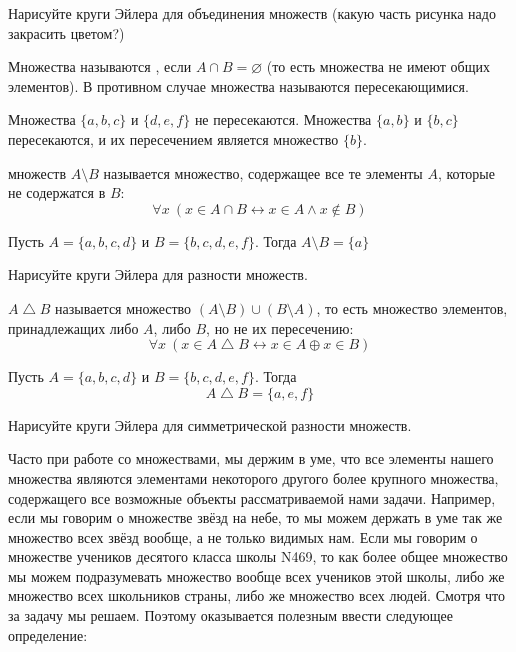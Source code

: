 \begin{exercise}
Нарисуйте круги Эйлера для объединения множеств (какую часть рисунка надо закрасить цветом?)
\end{exercise}

\begin{definition}
Множества называются , если $A\cap B = \varnothing$ (то есть множества не имеют общих элементов). В противном случае множества называются пересекающимися.
\end{definition}

\begin{example}
Множества $\{a, b, c\}$ и $\{d, e, f\}$ не пересекаются. Множества $\{a, b\}$ и $\{b, c\}$ пересекаются, и их пересечением является множество $\{b\}$.
\end{example}

\begin{definition}
 множеств $A\setminus B$ называется множество, содержащее все те элементы $A$, которые не содержатся в $B$:
$$\forall x\ (x \in A\cap B \leftrightarrow x\in A \wedge x \not \in B)$$
\end{definition}

\begin{example}
Пусть $A = \{a, b, c, d\}$ и $B = \{b, c, d, e, f\}$. Тогда $A\setminus B = \{a\}$
\end{example}

\begin{exercise}
Нарисуйте круги Эйлера для разности множеств.
\end{exercise}

\begin{definition}
 $A\bigtriangleup B$ называется множество $(A\setminus B)\cup (B\setminus A)$, то есть множество элементов, принадлежащих либо $A$, либо $B$, но не их пересечению:
$$\forall x\ (x\in A\bigtriangleup B \leftrightarrow x\in A \oplus x\in B)$$
\end{definition}

\begin{example}Пусть $A = \{a, b, c, d\}$ и $B = \{b, c, d, e, f\}$. Тогда
$$A\bigtriangleup B = \{a, e, f\}$$
\end{example}

\begin{exercise}
Нарисуйте круги Эйлера для симметрической разности множеств.
\end{exercise}

Часто при работе со множествами, мы держим в уме, что все элементы нашего множества являются элементами некоторого другого более крупного множества, содержащего все возможные объекты рассматриваемой нами задачи. Например, если мы говорим о множестве звёзд на небе, то мы можем держать в уме так же множество всех звёзд вообще, а не только видимых нам. Если мы говорим о множестве учеников десятого класса школы N469, то как более общее множество мы можем подразумевать множество вообще всех учеников этой школы, либо же множество всех школьников страны, либо же множество всех людей. Смотря что за задачу мы решаем. Поэтому оказывается полезным ввести следующее определение:

